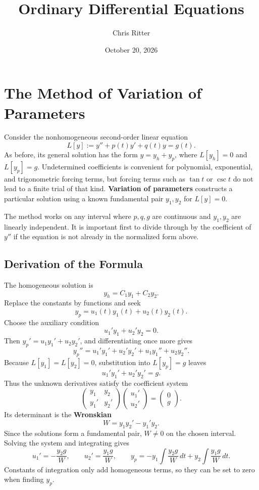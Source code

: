 \documentclass[11pt]{article}
\title{Ordinary Differential Equations}
\author{Chris Ritter}
\date{October 20, 2026}
\begin{document}
\maketitle
\tableofcontents
\newpage

\section{The Method of Variation of Parameters}

Consider the nonhomogeneous second-order linear equation
\[
L[y]:=y''+p(t)y'+q(t)y=g(t).
\]
As before, its general solution has the form \(y=y_h+y_p\), where
\(L[y_h]=0\) and \(L[y_p]=g\). Undetermined coefficients is convenient
for polynomial, exponential, and trigonometric forcing terms, but
forcing terms such as \(\tan t\) or \(\csc t\) do not lead to a finite
trial of that kind. \textbf{Variation of parameters} constructs a
particular solution using a known fundamental pair \(y_1,y_2\) for
\(L[y]=0\).

The method works on any interval where \(p,q,g\) are continuous and
\(y_1,y_2\) are linearly independent. It is important first to divide
through by the coefficient of \(y''\) if the equation is not already
in the normalized form above.

\subsection{Derivation of the Formula}

The homogeneous solution is
\[
y_h=C_1y_1+C_2y_2.
\]
Replace the constants by functions and seek
\[
y_p=u_1(t)y_1(t)+u_2(t)y_2(t).
\]
Choose the auxiliary condition
\[
u_1'y_1+u_2'y_2=0.
\]
Then \(y_p'=u_1y_1'+u_2y_2'\), and differentiating once more gives
\[
y_p''=u_1'y_1'+u_2'y_2'+u_1y_1''+u_2y_2''.
\]
Because \(L[y_1]=L[y_2]=0\), substitution into \(L[y_p]=g\) leaves
\[
u_1'y_1'+u_2'y_2'=g.
\]
Thus the unknown derivatives satisfy the coefficient system
\[
\begin{pmatrix}y_1&y_2\\y_1'&y_2'\end{pmatrix}
\begin{pmatrix}u_1'\\u_2'\end{pmatrix}
=\begin{pmatrix}0\\g\end{pmatrix}.
\]
Its determinant is the \textbf{Wronskian}
\[
W=y_1y_2'-y_1'y_2.
\]
Since the solutions form a fundamental pair, \(W\ne0\) on the chosen
interval. Solving the system and integrating gives
\[
\boxed{u_1'=-\frac{y_2g}{W},\qquad
u_2'=\frac{y_1g}{W},\qquad
y_p=-y_1\int\frac{y_2g}{W}\,dt
+y_2\int\frac{y_1g}{W}\,dt.}
\]
Constants of integration only add homogeneous terms, so they can be
set to zero when finding \(y_p\).
\end{document}
